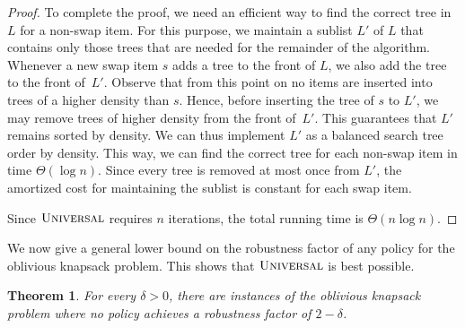 \documentclass[11pt]{article}
\newtheorem{theorem}{Theorem}
\begin{document}
\begin{proof}
To complete the proof, we need an efficient way to find the correct
tree in $L$ for a non-swap item. For this purpose, we maintain a
sublist $L'$ of $L$ that contains only those trees that are needed
for the remainder of the algorithm. Whenever a new swap item $s$
adds a tree to the front of $L$, we also add the tree to the front
of~$L'$. Observe that from this point on no items are inserted into
trees of a higher density than $s$. Hence, before inserting the tree
of $s$ to $L'$, we may remove trees of higher density from the front
of~$L'$. This guarantees that $L'$ remains sorted by density. We
can thus implement $L'$ as a balanced search tree order by density.
This way, we can find the correct tree for each non-swap item in time
$\Theta(\log n)$. Since every tree is removed at most once from $L'$,
the amortized cost for maintaining the sublist is constant for each
swap item.

Since $\textsc{Universal}$ requires $n$ iterations, the total running
time is $\Theta(n\log n)$.  
\end{proof}
We now give a general lower bound on the robustness factor of any
policy for the oblivious knapsack problem. This shows that $\textsc{Universal}$
is best possible.
\begin{theorem}
For every $\delta>0$, there are instances of the oblivious knapsack
problem where no policy achieves a robustness factor of $2-\delta$.\end{theorem}
\end{document}
